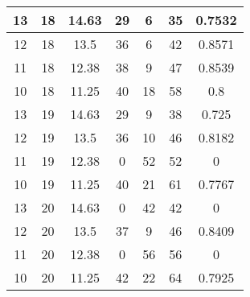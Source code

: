 \documentclass[letterpaper, 12pt]{article}
\begin{document}
\begin{longtable}{|c|c|c|c|c|c|c|}
\hline
13 & 18 & 14.63 & 29 & 6 & 35 & 0.7532 \\
\hline
12 & 18 & 13.5 & 36 & 6 & 42 & 0.8571 \\
\hline
11 & 18 & 12.38 & 38 & 9 & 47 & 0.8539 \\
\hline
10 & 18 & 11.25 & 40 & 18 & 58 & 0.8 \\
\hline
13 & 19 & 14.63 & 29 & 9 & 38 & 0.725 \\
\hline
12 & 19 & 13.5 & 36 & 10 & 46 & 0.8182 \\
\hline
11 & 19 & 12.38 & 0 & 52 & 52 & 0 \\
\hline
10 & 19 & 11.25 & 40 & 21 & 61 & 0.7767 \\
\hline
13 & 20 & 14.63 & 0 & 42 & 42 & 0 \\
\hline
12 & 20 & 13.5 & 37 & 9 & 46 & 0.8409 \\
\hline
11 & 20 & 12.38 & 0 & 56 & 56 & 0 \\
\hline
10 & 20 & 11.25 & 42 & 22 & 64 & 0.7925 \\
\hline
\end{longtable}
\end{document}
